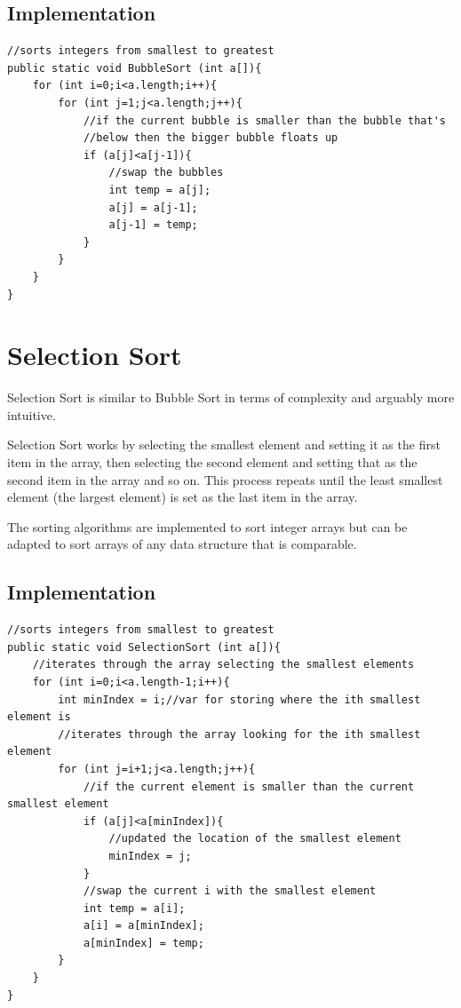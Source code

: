 \documentclass[11pt,oneside]{book}
\begin{document}
\subsection{Implementation}

\begin{lstlisting}
//sorts integers from smallest to greatest
public static void BubbleSort (int a[]){
    for (int i=0;i<a.length;i++){
        for (int j=1;j<a.length;j++){
            //if the current bubble is smaller than the bubble that's 
            //below then the bigger bubble floats up
            if (a[j]<a[j-1]){
                //swap the bubbles
                int temp = a[j];
                a[j] = a[j-1];
                a[j-1] = temp;
            }
        }
    }
}
\end{lstlisting}
\section{Selection Sort}

Selection Sort is similar to Bubble Sort in terms of complexity and arguably more intuitive.

Selection Sort works by selecting the smallest element and setting it as the first item in the array, then selecting the second element and setting that as the second item in the array and so on. This process repeats until the least smallest element (the largest element) is set as the last item in the array.

The sorting algorithms are implemented to sort integer arrays but can be adapted to sort arrays of any data structure that is comparable.

\subsection{Implementation}

\begin{lstlisting}
//sorts integers from smallest to greatest
public static void SelectionSort (int a[]){
    //iterates through the array selecting the smallest elements
    for (int i=0;i<a.length-1;i++){
        int minIndex = i;//var for storing where the ith smallest element is
        //iterates through the array looking for the ith smallest element
        for (int j=i+1;j<a.length;j++){
            //if the current element is smaller than the current smallest element
            if (a[j]<a[minIndex]){
                //updated the location of the smallest element
                minIndex = j;
            }
            //swap the current i with the smallest element
            int temp = a[i];
            a[i] = a[minIndex];
            a[minIndex] = temp;
        }
    }
}
\end{lstlisting}
\end{document}
